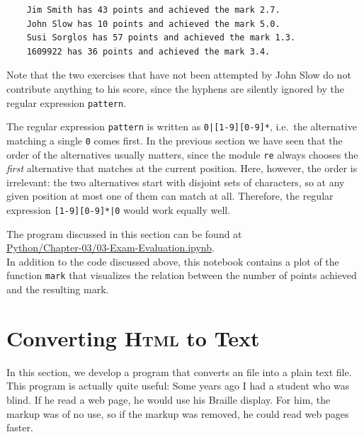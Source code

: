 \begin{verbatim}
    Jim Smith has 43 points and achieved the mark 2.7.
    John Slow has 10 points and achieved the mark 5.0.
    Susi Sorglos has 57 points and achieved the mark 1.3.
    1609922 has 36 points and achieved the mark 3.4.
\end{verbatim}

\noindent
Note that the two exercises that have not been attempted by John Slow do not contribute anything to his score,
since the hyphens are silently ignored by the regular expression \texttt{pattern}.

\remarkEng
The regular expression \texttt{pattern} is written as \texttt{0|[1-9][0-9]*}, i.e.\ the alternative
matching a single \texttt{0} comes first.  In the previous section we have seen that the order of the
alternatives usually matters, since the module \texttt{re} always chooses the \emph{first} alternative that
matches at the current position.  Here, however, the order is irrelevant: the two alternatives start with
disjoint sets of characters, so at any given position at most one of them can match at all.  Therefore, the
regular expression \texttt{[1-9][0-9]*|0} would work equally well.
\eox

\noindent
The program discussed in this section can be found at
\\[0.2cm]
\hspace*{1.3cm}
\href{https://github.com/karlstroetmann/Formal-Languages/blob/master/Python/Chapter-03/03-Exam-Evaluation.ipynb}{Python/Chapter-03/03-Exam-Evaluation.ipynb}.
\\[0.2cm]
In addition to the code discussed above, this notebook contains a plot of the function \texttt{mark} that
visualizes the relation between the number of points achieved and the resulting mark.

\section{Converting \textsc{Html} to Text \label{section:html2text}}
In this section, we develop a program that converts an  file into a plain text file.  This
program is actually quite useful: Some years ago I had a student who was blind.  If he read a web page, he
would use his Braille display.  For him, the  markup was of no use, so if the markup was
removed, he could read web pages faster.

